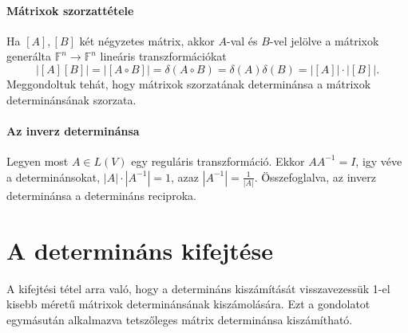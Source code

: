 \documentclass[9pt, a4paper, showtrims]{memoir}
\theoremstyle{plain}
\theoremstyle{remark}
\theoremstyle{definition}
\begin{document}
\paragraph{Mátrixok szorzattétele} 
Ha $[A],[B]$ két négyzetes mátrix, 
akkor $A$-val és $B$-vel jelölve a 
mátrixok generálta $\mathbb{F}^n\to\mathbb{F}^n$ lineáris transzformációkat
\[
    |[A][B]|=|[A\circ B]|=\delta\left( A\circ B \right)=\delta\left( A \right)\delta\left( B \right)=
    |[A]|\cdot|[B]|.
\]
Meggondoltuk tehát, hogy mátrixok szorzatának determinánsa a mátrixok determinánsának szorzata.

\paragraph{Az inverz determinánsa}
Legyen most $A\in L\left( V \right)$ egy reguláris transzformáció.
Ekkor $AA^{-1}=I$, igy véve a determinánsokat, $|A|\cdot|A^{-1}|=1$, azaz 
$|A^{-1}|=\frac{1}{|A|}$.
Összefoglalva, az inverz determinánsa a determináns reciproka.

\section{A determináns kifejtése}
A kifejtési tétel arra való, 
hogy a determináns kiszámítását visszavezessük 1-el kisebb méretű mátrixok determinánsának kiszámolására.
Ezt a gondolatot egymásután alkalmazva tetszőleges mátrix determinánsa kiszámítható.
\end{document}
